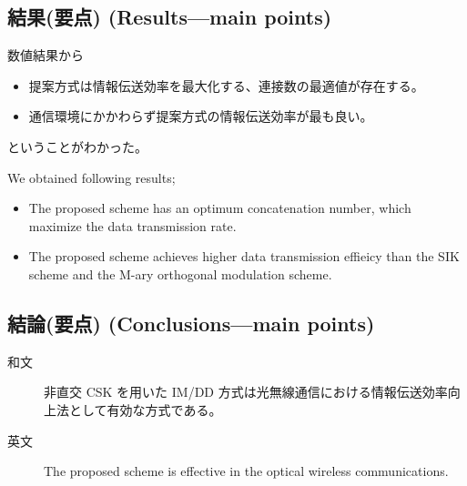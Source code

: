 ﻿\documentclass[a4j,10pt]{jarticle}
\begin{document}
\subsection{結果(要点) (Results---main points)}\label{results}
\begin{description}
 \item[和文] 数値結果から
 \begin{itemize}
 \item 提案方式は情報伝送効率を最大化する、連接数の最適値が存在する。
 \item 通信環境にかかわらず提案方式の情報伝送効率が最も良い。
 \end{itemize}
ということがわかった。
%
 \item We obtained following results;
 \begin{itemize}
 \item The proposed scheme has an optimum concatenation number, which maximize the data transmission rate. 
 \item The proposed scheme achieves higher data transmission effieicy than the SIK scheme and the M-ary orthogonal modulation scheme. 
 \end{itemize}
%
\end{description}
%
\subsection{結論(要点) (Conclusions---main points)}\label{conclusions}
\begin{description}
 \item[和文] 非直交 CSK を用いた IM/DD 方式は光無線通信における情報伝送効率向上法として有効な方式である。
%
 \item[英文] The proposed scheme is effective in the optical wireless communications. 
\end{description}
%
\end{document}
